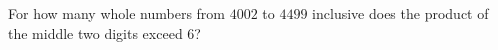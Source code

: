 For how many whole numbers from $4002$ to $4499$ inclusive does the product of the middle two digits exceed $6$?
